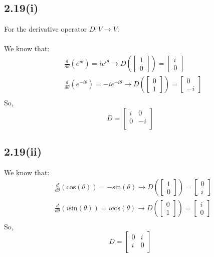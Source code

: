 \documentclass[letterpaper,12pt]{article}
\theoremstyle{definition}
\begin{document}
\subsection*{2.19(i)}
For the derivative operator $D:V\rightarrow V$:\\
\\
We know that:
\begin{align*}
    &\frac{d}{d\theta}\left( e^{i\theta} \right) = ie^{i\theta} \rightarrow
    D\left( \begin{bmatrix} 1 \\ 0 \end{bmatrix} \right) = \begin{bmatrix} i \\ 0 \end{bmatrix} \\
    &\frac{d}{d\theta}\left( e^{-i\theta} \right) = -ie^{-i\theta} \rightarrow
    D\left( \begin{bmatrix} 0 \\ 1 \end{bmatrix} \right) = \begin{bmatrix} 0 \\ -i \end{bmatrix} \\
\end{align*}
So,
\[
D = \begin{bmatrix}
i & 0 \\
0 & -i \\
\end{bmatrix}
\]
\subsection*{2.19(ii)}
We know that:
\begin{align*}
    &\frac{d}{d\theta}\left( \text{cos}(\theta) \right) = -\text{sin}(\theta) \rightarrow
    D\left( \begin{bmatrix} 1 \\ 0 \end{bmatrix} \right) = \begin{bmatrix} 0 \\ i \end{bmatrix} \\
    &\frac{d}{d\theta}\left( i\text{sin}(\theta) \right) = i\text{cos}(\theta) \rightarrow
    D\left( \begin{bmatrix} 0 \\ 1 \end{bmatrix} \right) = \begin{bmatrix} i \\ 0 \end{bmatrix} \\
\end{align*}
So,
\[
D= \begin{bmatrix}
0 & i \\
i & 0 \\
\end{bmatrix}
\]
\end{document}
